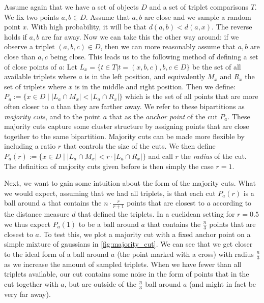 Assume again that we have a set of objects $D$ and a set of triplet comparisons $T$. We fix two points $a,b \in D$. Assume that $a,b$ are close and we sample a random point $x$.
With high probability, it will be that $d(a,b) < d(a,x)$. The reverse holds if $a,b$ are far away. Now we can take this the other way around: 
if we observe a triplet $(a,b,c) \in D$, then we can more reasonably assume that $a,b$ are close than $a,c$ being close. This leads us to the following method of defining
a set of close points of $a$: Let $L_x = \{t \in T | t = (x, b,c), b,c \in D\}$ be the set of all available triplets where $a$ is in the left position, and equivalently $M_x$ and $R_x$ 
the set of triplets where $x$ is in the middle and right position. Then we define: $P_a := \{x \in D \mid \left|   L_a \cap M_x\right| < \left| L_a \cap R_x \right| \}$
which is the set of all points that are more often closer to $a$ than they are farther away. We refer to these bipartitions as \textit{majority cuts}, and to the point $a$ that
as the \textit{anchor point} of the cut $P_a$. These majority cuts capture
some cluster structure by assigning points that are close together to the same bipartition. Majority cuts can be made more flexible by including a ratio $r$ that controls the size of the cuts. 
We then define $P_a(r) := \{x \in D \mid \left|   L_a \cap M_x\right| < r \cdot \left| L_a \cap R_x \right| \}$ and call $r$ the \textit{radius} of the cut. 
The definition of majority cuts given before is then simply the case $r = 1$. 

Next, we want to gain some intuition about the form of the majority cuts. What we would expect, assuming that we had all triplets, is that each cut
$P_a(r)$ is a ball around $a$ that contains the $n \cdot \frac{r}{r+1}$ points that are closest to $a$ according to the distance measure $d$ that defined the triplets. In a euclidean setting for 
$r = 0.5$ we thus expect $P_a(1)$ to be a ball around $a$ that contains the $\frac{n}{3}$ points that are closest to $a$. To test this, we plot a majority cut with a fixed anchor point on a 
simple mixture of gaussians in \autoref{fig:majority_cut}. 
We can see that we get closer to the ideal form of a ball around $a$ (the point marked with a cross) with radius $\frac{n}{3}$ as we increase the amount of sampled triplets.
When we have fewer than all triplets available, our cut contains some noise in the form of points that in the cut together with $a$, but are outside of the $\frac{n}{3}$ ball around $a$ (and might in fact be very far away).

